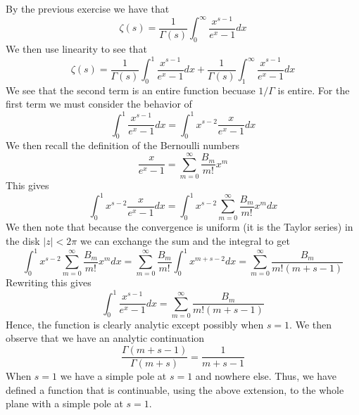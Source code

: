 \documentclass{article}
\begin{document}
By the previous exercise we have that
\[
\zeta(s) = \frac{1}{\Gamma(s)}\int_0^\infty \frac{x^{s-1}}{e^x-1}dx
\]
We then use linearity to see that
\[
\zeta(s) = \frac{1}{\Gamma(s)}\int_0^1 \frac{x^{s-1}}{e^x-1}dx +
\frac{1}{\Gamma(s)}\int_1^\infty \frac{x^{s-1}}{e^x-1}dx
\]
We see that the second term is an entire function becuase $1/\Gamma$
is entire. For the first term we must consider the behavior of
\[
\int_0^1 \frac{x^{s-1}}{e^x-1}dx = \int_0^1 x^{s-2}\frac{x}{e^x-1}dx
\]
We then recall the definition of the Bernoulli numbers
\[
\frac{x}{e^x-1} = \sum_{m=0}^\infty \frac{B_m}{m!}x^m
\]
This gives
\[
\int_0^1 x^{s-2}\frac{x}{e^x-1}dx = \int_0^1 x^{s-2}\sum_{m=0}^\infty
\frac{B_m}{m!}x^mdx
\]
We then note that because the convergence is uniform (it is the Taylor
series) in the disk $|z| < 2\pi$ we can exchange the sum and the
integral to get
\[
\int_0^1 x^{s-2}\sum_{m=0}^\infty \frac{B_m}{m!}x^mdx =
\sum_{m=0}^\infty\frac{B_m}{m!}\int_0^1x^{m+s-2}dx = \sum_{m=0}^\infty
\frac{B_m}{m!(m+s-1)}
\]
Rewriting this gives
\[
\int_0^1 \frac{x^{s-1}}{e^x-1}dx = \sum_{m=0}^\infty
\frac{B_m}{m!(m+s-1)}
\]
Hence, the function is clearly analytic except possibly when $s =
1$. We then observe that we have an analytic continuation
\[
\frac{\Gamma(m+s-1)}{\Gamma(m+s)} = \frac{1}{m+s-1}
\]
When $s = 1$ we have a simple pole at $s=1$ and nowhere else. Thus, we
have defined a function that is continuable, using the above
extension, to the whole plane with a simple pole at $s=1$.
\end{document}
